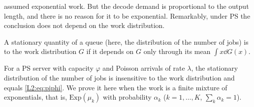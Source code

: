  assumed exponential work. But the decode demand is proportional to the
output length, and there is no reason for it to be exponential. Remarkably, under PS
the conclusion does not depend on the work distribution.

\begin{definition}[Insensitivity]\label{L2:def:insens}
A stationary quantity of a queue (here, the distribution of the number of jobs) is
 to the work distribution $G$ if it depends on $G$ only through its
mean $\int x\dd G(x)$.
\end{definition}

\begin{theorem}\label{thm:insens}
For a PS server with capacity $\varphi$ and Poisson arrivals of rate $\lambda$, the
stationary distribution of the number of jobs is insensitive to the work distribution
and equals \eqref{L2:eq:piphi}. We prove it here when the work is a finite mixture of
exponentials, that is, $\mathrm{Exp}(\mu_k)$ with probability $\alpha_k$
($k=1,\dots,K$, $\sum_k\alpha_k=1$).
\end{theorem}
